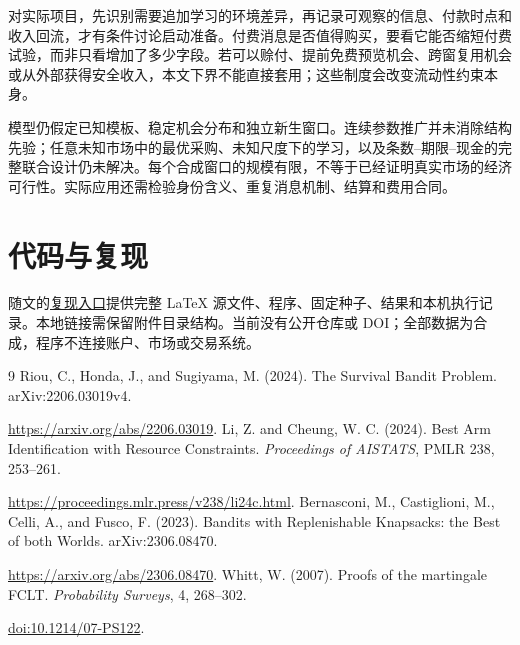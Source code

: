 对实际项目，先识别需要追加学习的环境差异，再记录可观察的信息、付款时点和收入回流，才有条件讨论启动准备。付费消息是否值得购买，要看它能否缩短付费试验，而非只看增加了多少字段。若可以赊付、提前免费预览机会、跨窗复用机会或从外部获得安全收入，本文下界不能直接套用；这些制度会改变流动性约束本身。

模型仍假定已知模板、稳定机会分布和独立新生窗口。连续参数推广并未消除结构先验；任意未知市场中的最优采购、未知尺度下的学习，以及条数--期限--现金的完整联合设计仍未解决。每个合成窗口的规模有限，不等于已经证明真实市场的经济可行性。实际应用还需检验身份含义、重复消息机制、结算和费用合同。

\section*{代码与复现}
随文的\href{README.md}{复现入口}提供完整 LaTeX 源文件、程序、固定种子、结果和本机执行记录。本地链接需保留附件目录结构。当前没有公开仓库或 DOI；全部数据为合成，程序不连接账户、市场或交易系统。

\begingroup\small
\begin{thebibliography}{9}\setlength{\itemsep}{2pt}
 Riou, C., Honda, J., and Sugiyama, M. (2024).
The Survival Bandit Problem. arXiv:2206.03019v4.\par
\url{https://arxiv.org/abs/2206.03019}.
 Li, Z. and Cheung, W. C. (2024). Best Arm Identification with Resource Constraints.
\emph{Proceedings of AISTATS}, PMLR 238, 253--261.\par
\url{https://proceedings.mlr.press/v238/li24c.html}.
 Bernasconi, M., Castiglioni, M., Celli, A., and Fusco, F. (2023).
Bandits with Replenishable Knapsacks: the Best of both Worlds. arXiv:2306.08470.\par
\url{https://arxiv.org/abs/2306.08470}.
 Whitt, W. (2007). Proofs of the martingale FCLT.
\emph{Probability Surveys}, 4, 268--302.\par
\href{https://doi.org/10.1214/07-PS122}{doi:10.1214/07-PS122}.
\end{thebibliography}\endgroup
